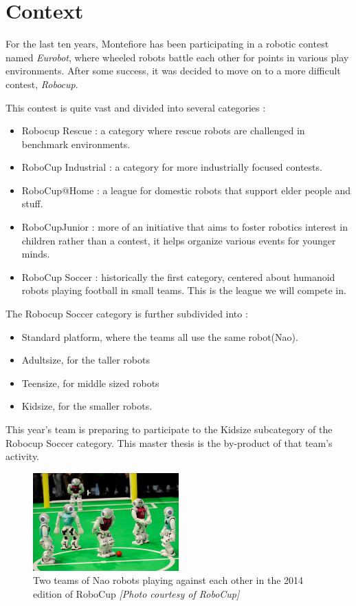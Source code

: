 \section{Context}
For the last ten years, Montefiore has been participating in a robotic contest named \emph{Eurobot}, where wheeled robots battle each other for points in various play environments. After some success, it was decided to move on to a more difficult contest, \emph{Robocup}.

This contest is quite vast and divided into several categories :
\begin{itemize}
\item Robocup Rescue : a category where rescue robots are challenged in benchmark environments.
\item RoboCup Industrial : a category for more industrially focused contests.
\item RoboCup@Home : a league for domestic robots that support elder people and stuff.
\item RoboCupJunior : more of an initiative that aims to foster robotics interest in children rather than a contest, it helps organize various events for younger minds.
\item RoboCup Soccer : historically the first category, centered about humanoid robots playing football in small teams. This is the league we will compete in.
\end{itemize}
The Robocup Soccer category is further subdivided into :\begin{itemize}
\item Standard platform, where the teams all use the same robot(Nao).
\item Adultsize, for the taller robots
\item Teensize, for middle sized robots
\item Kidsize, for the smaller robots.
\end{itemize}

This year's team is preparing to participate to the Kidsize subcategory of the Robocup Soccer category. This master thesis is the by-product of that team's activity.

\begin{figure}[htp]
\center
\includegraphics[width=0.5\textwidth]{figures/robocup}
\caption[Two teams of Nao robots playing against each other]{Two teams of Nao robots playing against each other in the 2014 edition of RoboCup \textit{[Photo courtesy of RoboCup]}}
\label{fig:intro_robocup}
\end{figure}

